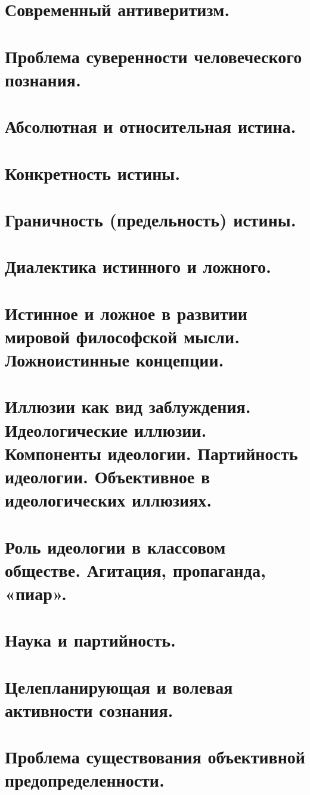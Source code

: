 \section{ Современный антиверитизм.}
\section{ Проблема суверенности человеческого познания.}
\section{ Абсолютная и относительная истина.}
\section{ Конкретность истины.}
\section{ Граничность (предельность) истины.}
\section{ Диалектика истинного и ложного.}
\section{ Истинное и ложное в развитии мировой философской мысли. Ложноистинные концепции.}
\section{ Иллюзии как вид заблуждения. Идеологические иллюзии. Компоненты идеологии. Партийность идеологии. Объективное в идеологических иллюзиях.}
\section{ Роль идеологии в классовом обществе. Агитация, пропаганда, «пиар».}
\section{ Наука и партийность.}
\section{ Целепланирующая и волевая активности сознания.}
\section{ Проблема существования объективной предопределенности.}
